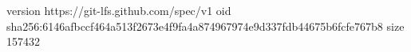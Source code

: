 version https://git-lfs.github.com/spec/v1
oid sha256:6146afbccf464a513f2673e4f9fa4a874967974e9d337fdb44675b6fcfe767b8
size 157432

